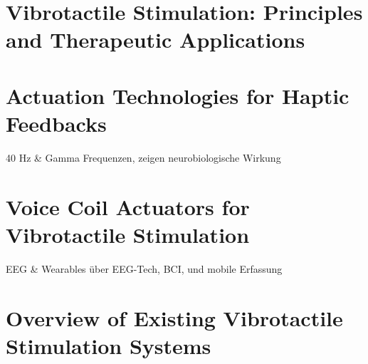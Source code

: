 \section{Vibrotactile Stimulation: Principles and Therapeutic Applications}
\cite{Campbell.2022}

\cite{ClementsCortes.2016, Heesterbeek.2019,Lam.2018, Clair.1993, Kim.2018, ClementsCortes.2017, Mercado.2006, ClementsCortes.2017b, ClementsCortes.2022}


\section{Actuation Technologies for Haptic Feedbacks}
40 Hz \& Gamma Frequenzen, \cite{ReikoTutida.2014} \cite{Mably.2018} \cite{Iaccarino.2016} \cite{Martorell.2019} zeigen neurobiologische Wirkung


\section{Voice Coil Actuators for Vibrotactile Stimulation}
EEG \& Wearables \cite{Guger.2012} \cite{Guger.2017} \cite{SebastianRomagosa.2020} \cite{Xu.2022} über EEG-Tech, BCI, und mobile Erfassung


\section{Overview of Existing Vibrotactile Stimulation Systems}





